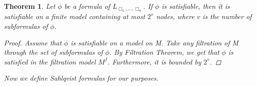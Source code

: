\documentclass[12pt, a4paper]{scrartcl}
\newtheorem{theorem}[definition]{Theorem}
\begin{document}
\begin{theorem}
    Let $\phi$ be a formula of $L_{\Box_1,...,\Box_n}$. If $\phi$ is satisfiable, then it is satisfiable on a finite model containing at most $2^v$ nodes, where $v$ is the number of subformulas of $\phi$.

    \begin{proof}
    Assume that $\phi$ is satisfiable on a model on M. Take any filtration of M through the set of subformulas of $\phi$. 
    By Filtration Theorem, we get that $\phi$ is satisfied in the filtration model $M^f$. Furthermore, it is bounded by $2^v$.
    
    \end{proof}
    
    Now we define Sahlqvist formulas for our purposes.
        
\end{theorem}
\end{document}
